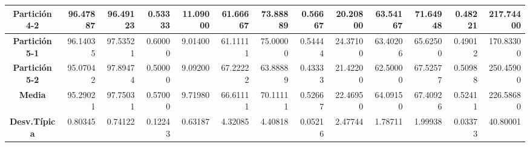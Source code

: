 \documentclass[a4paper,11pt]{article}
\begin{document}
\begin{table}[H]
\begin{adjustbox}{width=1.1\textwidth}
\begin{tabular}{|c|r|r|r|r|r|r|r|r|r|r|r|r|}
  \textbf{Partición 4-2} & 96.47887 & 96.49123 & 0.53333 & 11.09000 & 61.66667 & 73.88889 & 0.56667 & 20.20800 & 63.54167 & 71.64948 & 0.48221 & 217.74400 \\ \hline
  \textbf{Partición 5-1} & 96.14035 & 97.53521 & 0.60000 & 9.01400 & 61.11111 & 75.00000 & 0.54444 & 24.37100 & 63.40206 & 65.62500 & 0.49012 & 170.83300 \\ \hline
  \textbf{Partición 5-2} & 95.07042 & 97.89474 & 0.50000 & 9.09200 & 67.22222 & 63.88889 & 0.43333 & 21.42200 & 62.50000 & 67.52577 & 0.50988 & 250.45900 \\ \hline
  \textbf{Media} & 95.29021 & 97.75031 & 0.57000 & 9.71980 & 66.61111 & 70.11111 & 0.52667 & 22.46950 & 64.09150 & 67.40926 & 0.52411 & 226.58680 \\ \hline
  \textbf{Desv.Típica} & 0.80345 & 0.74122 & 0.12243 & 0.63187 & 4.32085 & 4.40818 & 0.05216 & 2.47744 & 1.78711 & 1.99938 & 0.03373 & 40.80001 \\ \hline
  \end{tabular}
  \end{adjustbox}
  \label{}
  \end{table}
  
\end{document}
